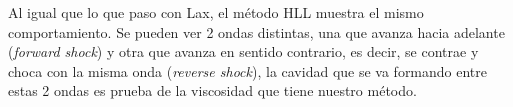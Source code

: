 \documentclass[12pt,a4paper]{book}
\begin{document}
Al igual que lo que paso con Lax, el método HLL muestra el mismo comportamiento. Se pueden ver 2 ondas distintas, una que avanza hacia adelante (\emph{forward shock}) y otra que avanza en sentido contrario, es decir, se contrae y choca con la misma onda (\emph{reverse shock}), la cavidad que se va formando entre estas 2 ondas es prueba de la viscosidad que tiene nuestro método.

\begin{figure}[H]
\centering
{}

\end{figure}
\end{document}
